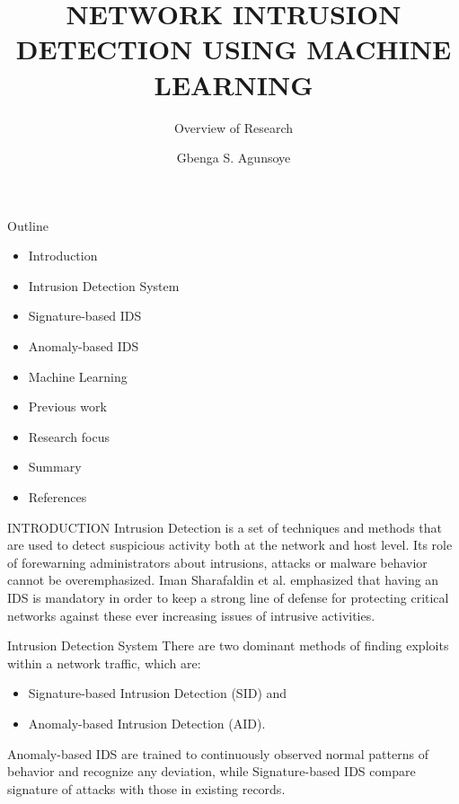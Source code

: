 \documentclass[pdf]
{beamer}
\title{NETWORK INTRUSION DETECTION USING MACHINE LEARNING}
\subtitle{Overview of Research}
\author{Gbenga S. Agunsoye}
\begin{document}
\begin{frame}
    \titlepage
\end{frame}
\begin{frame}{Outline}
    \begin{itemize}
        \item Introduction
        \pause
        \item Intrusion Detection System
        \pause
        \item Signature-based IDS
        \pause
        \item Anomaly-based IDS
        \pause
        \item Machine Learning
        \pause
        \item Previous work
        \pause
        \item Research focus
        \pause
        \item Summary
        \pause
        \item References
    \end{itemize}

\end{frame}

\begin{frame}{INTRODUCTION}
    Intrusion Detection is a set of techniques and methods that are used to detect suspicious activity both at the network and host level.
    Its role of forewarning administrators about intrusions, attacks or malware behavior cannot be overemphasized. Iman Sharafaldin et al. emphasized that having an IDS is mandatory in order to keep a strong line of defense for protecting critical networks against these ever increasing issues of intrusive activities. 

    
\end{frame}

\begin{frame}{Intrusion Detection System}
    There are two dominant methods of finding exploits within a network traffic, which are:
    \begin{itemize}
        \item Signature-based Intrusion Detection (SID) and
        \item Anomaly-based Intrusion Detection (AID).
    \end{itemize}

    Anomaly-based IDS are trained to continuously observed normal patterns of behavior and recognize any deviation, while 
    Signature-based IDS compare signature of attacks with those in existing records. 


    
\end{frame}
\end{document}
